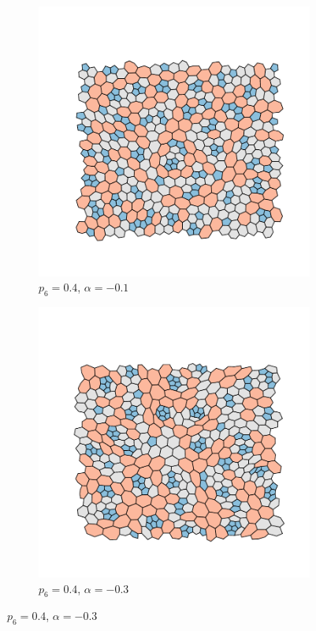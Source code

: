 \begin{figure}[bt]
     \vspace{2mm}
     \begin{subfigure}[b]{0.45\textwidth}
         \centering
         \includegraphics[width=\textwidth]{./figures/targeted_opt/topt_-10.pdf}
         \caption{$p_6=0.4$, $\alpha=-0.1$}
         \label{fig:toptconfigs3}
     \end{subfigure}
     \hfill
     \begin{subfigure}[b]{0.45\textwidth}
         \centering
         \includegraphics[width=\textwidth]{./figures/targeted_opt/topt_-30.pdf}
         \caption{$p_6=0.4$, $\alpha=-0.3$}
         \label{fig:toptconfigs4}
     \end{subfigure}
     \hfill


\end{figure}
